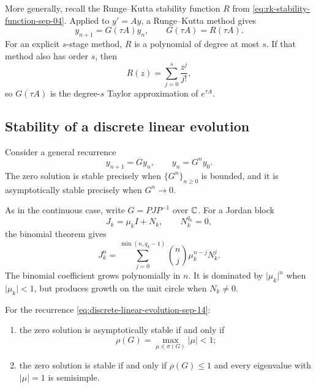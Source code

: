 More generally, recall the Runge--Kutta stability function
\(R\) from \eqref{eq:rk-stability-function-sep-04}. Applied to
\(y'=Ay\), a Runge--Kutta method gives
\begin{equation}\label{eq:rk-matrix-amplification-sep-14}
  y_{n+1}=G(\tau A)y_n,
  \qquad
  G(\tau A)=R(\tau A).
\end{equation}
For an explicit \(s\)-stage method, \(R\) is a polynomial of degree at
most \(s\). If that method also has order \(s\), then
\[
  R(z)=\sum_{j=0}^s\frac{z^j}{j!},
\]
so \(G(\tau A)\) is the degree-\(s\) Taylor approximation of
\(e^{\tau A}\).

\subsection{Stability of a discrete linear evolution}

Consider a general recurrence
\begin{equation}\label{eq:discrete-linear-evolution-sep-14}
  y_{n+1}=Gy_n,
  \qquad
  y_n=G^ny_0.
\end{equation}
The zero solution is stable precisely when \(\{G^n\}_{n\geq0}\) is
bounded, and it is asymptotically stable precisely when
\(G^n\to0\).

As in the continuous case, write \(G=PJP^{-1}\) over \(\mathbb{C}\). For
a Jordan block
\[
  J_k=\mu_kI+N_k,
  \qquad
  N_k^{q_k}=0,
\]
the binomial theorem gives
\begin{equation}\label{eq:discrete-jordan-power-sep-14}
  J_k^n
  =\sum_{j=0}^{\min(n,q_k-1)}
    \binom{n}{j}\mu_k^{n-j}N_k^j.
\end{equation}
The binomial coefficient grows polynomially in \(n\). It is dominated
by \(\lvert\mu_k\rvert^n\) when \(\lvert\mu_k\rvert<1\), but produces
growth on the unit circle when \(N_k\neq0\).

\begin{theorem}
  For the recurrence \eqref{eq:discrete-linear-evolution-sep-14}:
  \begin{enumerate}[label=\textup{(\roman*)}]
    \item the zero solution is asymptotically stable if and only if
      \[
        \rho(G)=\max_{\mu\in\sigma(G)}\lvert\mu\rvert<1;
      \]
    \item the zero solution is stable if and only if
      \(\rho(G)\leq1\) and every eigenvalue with
      \(\lvert\mu\rvert=1\) is semisimple.
  \end{enumerate}
\end{theorem}

